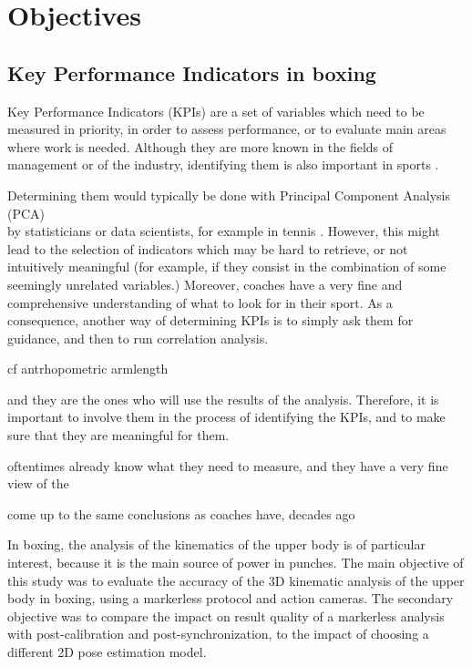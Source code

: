 \clearpage

\minitoc
\newpage






\section{Objectives}

\subsection{Key Performance Indicators in boxing}

Key Performance Indicators (KPIs) are a set of variables which need to be measured in priority, in order to assess performance, or to evaluate main areas where work is needed. Although they are more known in the fields of management or of the industry, identifying them is also important in sports \cite{Butterworth2013}.

Determining them would typically be done with Principal Component Analysis (PCA)\\\cite{Hotelling1933} by statisticians or data scientists, for example in tennis \cite{ODonoghue2008}. However, this might lead to the selection of indicators which may be hard to retrieve, or not intuitively meaningful (for example, if they consist in the combination of some seemingly unrelated variables.) Moreover, coaches have a very fine and comprehensive understanding of what to look for in their sport. As a consequence, another way of determining KPIs is to simply ask them for guidance, and then to run correlation analysis. 

cf antrhopometric armlength


and they are the ones who will use the results of the analysis. Therefore, it is important to involve them in the process of identifying the KPIs, and to make sure that they are meaningful for them.

oftentimes already know what they need to measure, and they have a very fine view of the 

come up to the same conclusions as coaches have, decades ago



In boxing, the analysis of the kinematics of the upper body is of particular interest, because it is the main source of power in punches. The main objective of this study was to evaluate the accuracy of the 3D kinematic analysis of the upper body in boxing, using a markerless protocol and action cameras. The secondary objective was to compare the impact on result quality of a markerless analysis with post-calibration and post-synchronization, to the impact of choosing a different 2D pose estimation model.


